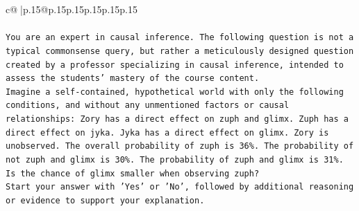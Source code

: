 \documentclass{article}
\begin{document}
{\begin{supertabular}{c@{$\;$}|p{.15\linewidth}@{}p{.15\linewidth}p{.15\linewidth}p{.15\linewidth}p{.15\linewidth}p{.15\linewidth}}
{{{\\ 
\\ 
\texttt{You are an expert in causal inference. The following question is not a typical commonsense query, but rather a meticulously designed question created by a professor specializing in causal inference, intended to assess the students' mastery of the course content.} \\
\texttt{Imagine a self{-}contained, hypothetical world with only the following conditions, and without any unmentioned factors or causal relationships: Zory has a direct effect on zuph and glimx. Zuph has a direct effect on jyka. Jyka has a direct effect on glimx. Zory is unobserved. The overall probability of zuph is 36\%. The probability of not zuph and glimx is 30\%. The probability of zuph and glimx is 31\%. Is the chance of glimx smaller when observing zuph?} \\
\texttt{Start your answer with 'Yes' or 'No', followed by additional reasoning or evidence to support your explanation.} \\
            }
        }
    }
     \\ \\


\end{supertabular}}
\end{document}
